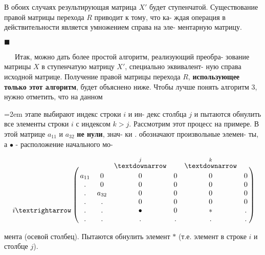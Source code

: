 	В обоих случаях результирующая матрица $X'$ будет ступенчатой.\linebreak
	Существование правой матрицы перехода $R$ приводит к тому, что ка-\linebreak
	ждая операция в действительности является умножением справа на эле-\linebreak
	ментарную матрицу.
	\begin{flushright}$\blacksquare$\end{flushright}
	{\ \ \ }Итак, можно дать более простой алгоритм, реализующий преобра-\linebreak
	зование матрицы $X$ в ступенчатую матрицу $X'$, специально эквивалент-\linebreak
	ную справа исходной матрице. Получение правой матрицы перехода $R$,\linebreak
	{\bf использующее только этот алгоритм}, будет объяснено ниже.\linebreak
	Чтобы лучше понять алгоритм 3, нужно отметить, что на данном\linebreak
	{\small
	\begin{minipage}[t]{80mm}\parindent=2em
		\noindent
		этапе выбирают индекс строки $i$ и ин-\linebreak
		декс столбца $j$ и пытаются обнулить все\linebreak
		элементы строки $i$ с индексом $k > j$.\linebreak
		Рассмотрим этот процесс на примере.\linebreak
		В этой матрице $a_{11}$ и $a_{32}$ {\bf не нули}, знач-\linebreak
		ки . обозначают произвольные элемен-\linebreak
		ты, а $\bullet$ - расположение начального мо-
	\end{minipage}
	\hfill
	\begin{minipage}[t]{50mm}
	\[ \bordermatrix{
		& & & \stackrel{j}{\textdownarrow} & & \stackrel{k}{\textdownarrow} & \cr
		& a_{11} & 0 & 0 & 0 & 0 & 0 \cr
		& . & 0 & 0 & 0 & 0 & 0 \cr
		& . & a_{32} & 0 & 0 & 0 & 0 \cr
		& . & . & 0 & 0 & 0 & 0 \cr
		i\textrightarrow  & . & . & \bullet & 0 & \ast & . \cr
	    & . & . & . & . & . & . \cr}
	\]
	\end{minipage}}

	\pagebreak
	
	
	\noindent
	мента (осевой столбец). Пытаются обнулить элемент $\ast$ (т.е. элемент в\linebreak
	строке $i$ и столбце $j$).
	
